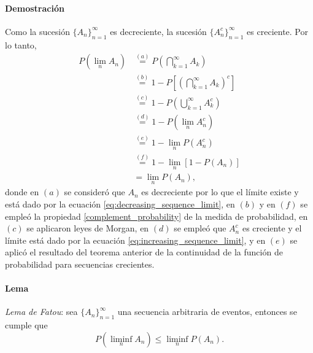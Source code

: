 \documentclass[a4paper]{report}
\begin{document}
\paragraph{Demostración} Como la sucesión \(\{A_n\}_{n=1}^{\infty}\) es decreciente, la sucesión \(\{A_n^c\}_{n=1}^{\infty}\) es creciente. Por lo tanto,
\begin{align*}
 P\left(\lim_n A_n\right)&\overset{(a)}{=}P\left(\bigcap_{k=1}^{\infty}A_k\right)\\
   &\overset{(b)}{=}1-P\left[\left(\bigcap_{k=1}^{\infty}A_k\right)^c\right]\\
   &\overset{(c)}{=}1-P\left(\bigcup_{k=1}^{\infty}A_k^c\right)\\
   &\overset{(d)}{=}1-P\left(\lim_n A_n^c\right)\\
   &\overset{(e)}{=}1-\lim_n P\left(A_n^c\right)\\
   &\overset{(f)}{=}1-\lim_n\left[1-P(A_n)\right]\\
   &=\lim_n P(A_n),
\end{align*}
donde en \((a)\) se consideró que \(A_n\) es decreciente por lo que el límite existe y está dado por la ecuación \ref{eq:decreasing_sequence_limit}, en \((b)\) y en \((f)\) se empleó la propiedad \ref{complement_probability} de la medida de probabilidad, en \((c)\) se aplicaron leyes de Morgan, en \((d)\) se empleó que \(A_n^c\) es creciente y el límite está dado por la ecuación \ref{eq:increasing_sequence_limit}, y en \((e)\) se aplicó el resultado del teorema anterior de la continuidad de la función de probabilidad para secuencias crecientes.

\paragraph{Lema} \emph{Lema de Fatou}: sea \(\{A_n\}_{n=1}^{\infty}\) una secuencia arbitraria de eventos, entonces se cumple que
\begin{equation}\label{eq:fatou_lemma}
  P\left(\liminf_n A_n\right)\leq\liminf_n P\left(A_n\right).
\end{equation}
\end{document}
